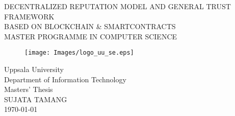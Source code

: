 
\thispagestyle{empty}

\vspace*{+5em}
\begin{center}
DECENTRALIZED REPUTATION MODEL AND GENERAL TRUST FRAMEWORK\\
BASED ON BLOCKCHAIN \& SMARTCONTRACTS \\
\vspace*{+8em}
\vspace{+2em}
MASTER PROGRAMME IN COMPUTER SCIENCE\\

\vspace*{+3em}
\begin{figure}[H]
\centering
\texttt{[image: Images/logo\_uu\_se.eps]}
\end{figure}

\vspace*{+3em}
Uppsala University\\
Department of Information Technology\\
\vspace*{+2em}
Masters' Thesis \\
SUJATA TAMANG\\

\vspace*{+12em}
\today
\end{center}
